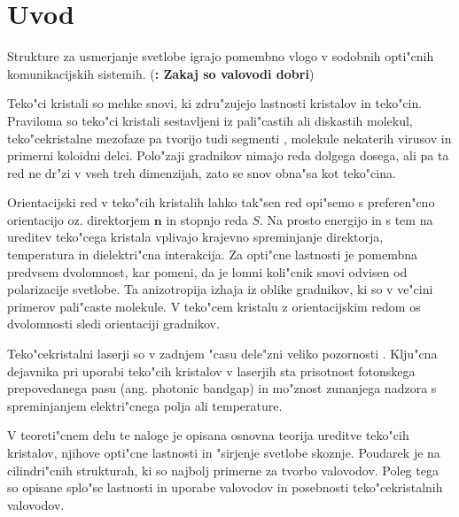 \documentclass[a4paper,10pt]{article}
\newcommand{\todo}[1]{(\textbf{\textsmaller{TODO}: #1})}
\begin{document}
\newpage
\tableofcontents

\newpage
\section{Uvod} %


Strukture za usmerjanje svetlobe igrajo pomembno vlogo v sodobnih opti"cnih komunikacijskih sistemih\cite{ruetschi-1994}. 
\todo{Zakaj so valovodi dobri}




Teko"ci kristali so mehke snovi, ki zdru"zujejo lastnosti kristalov in teko"cin\cite{degennes}. 
Praviloma so teko"ci kristali sestavljeni iz pali"castih ali diskastih molekul, teko"cekristalne mezofaze pa tvorijo tudi segmenti , molekule nekaterih virusov in primerni koloidni delci. 
Polo"zaji gradnikov nimajo reda dolgega dosega, ali pa ta red ne dr"zi v vseh treh dimenzijah, zato se snov obna"sa kot teko"cina. 

Orientacijski red v teko"cih kristalih lahko tak"sen red opi"semo s preferen"cno orientacijo oz. direktorjem $\mathbf{n}$ in stopnjo reda $S$. 
Na prosto energijo in s tem na ureditev teko"cega kristala vplivajo krajevno spreminjanje direktorja, temperatura in dielektri"cna interakcija. 
Za opti"cne lastnosti je pomembna predvsem dvolomnost, kar pomeni, da je lomni koli"cnik snovi odvisen od polarizacije svetlobe. 
Ta anizotropija izhaja iz oblike gradnikov, ki so v ve"cini primerov pali"caste molekule. 
V teko"cem kristalu z orientacijskim redom os dvolomnosti sledi orientaciji gradnikov. 


Teko"cekristalni laserji so v zadnjem "casu dele"zni veliko pozornosti \cite{coles-morris, humar-musevic, humar-ravnik}. 
Klju"cna dejavnika pri uporabi teko"cih kristalov v laserjih sta prisotnost fotonskega prepovedanega pasu (ang. photonic bandgap) in mo"znost zunanjega nadzora s spreminjanjem elektri"cnega polja ali temperature. 

V teoreti"cnem delu te naloge je opisana osnovna teorija ureditve teko"cih kristalov, njihove opti"cne lastnosti in "sirjenje svetlobe skoznje. 
Poudarek je na cilindri"cnih strukturah, ki so najbolj primerne za tvorbo valovodov. 
Poleg tega so opisane splo"se lastnosti in uporabe valovodov in posebnosti teko"cekristalnih valovodov. 
\end{document}

